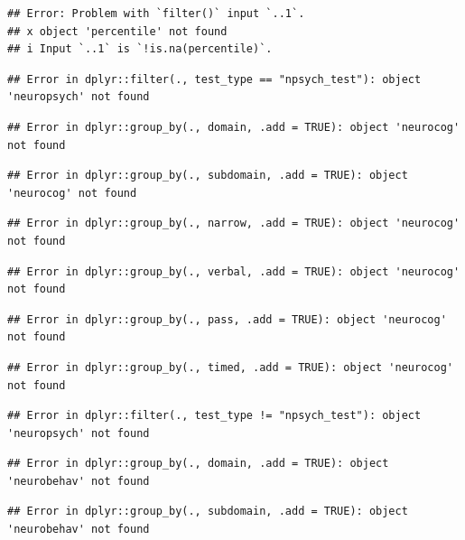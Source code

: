 \documentclass[%
numbers=noendperiod,
parskip=half,
bibliography=totoc,
DIV=calc,headsepline=true,
]{scrartcl}
\begin{document}
\begin{verbatim}
## Error: Problem with `filter()` input `..1`.
## x object 'percentile' not found
## i Input `..1` is `!is.na(percentile)`.
\end{verbatim}

\begin{verbatim}
## Error in dplyr::filter(., test_type == "npsych_test"): object 'neuropsych' not found
\end{verbatim}

\begin{verbatim}
## Error in dplyr::group_by(., domain, .add = TRUE): object 'neurocog' not found
\end{verbatim}

\begin{verbatim}
## Error in dplyr::group_by(., subdomain, .add = TRUE): object 'neurocog' not found
\end{verbatim}

\begin{verbatim}
## Error in dplyr::group_by(., narrow, .add = TRUE): object 'neurocog' not found
\end{verbatim}

\begin{verbatim}
## Error in dplyr::group_by(., verbal, .add = TRUE): object 'neurocog' not found
\end{verbatim}

\begin{verbatim}
## Error in dplyr::group_by(., pass, .add = TRUE): object 'neurocog' not found
\end{verbatim}

\begin{verbatim}
## Error in dplyr::group_by(., timed, .add = TRUE): object 'neurocog' not found
\end{verbatim}

\begin{verbatim}
## Error in dplyr::filter(., test_type != "npsych_test"): object 'neuropsych' not found
\end{verbatim}

\begin{verbatim}
## Error in dplyr::group_by(., domain, .add = TRUE): object 'neurobehav' not found
\end{verbatim}

\begin{verbatim}
## Error in dplyr::group_by(., subdomain, .add = TRUE): object 'neurobehav' not found
\end{verbatim}
\end{document}
